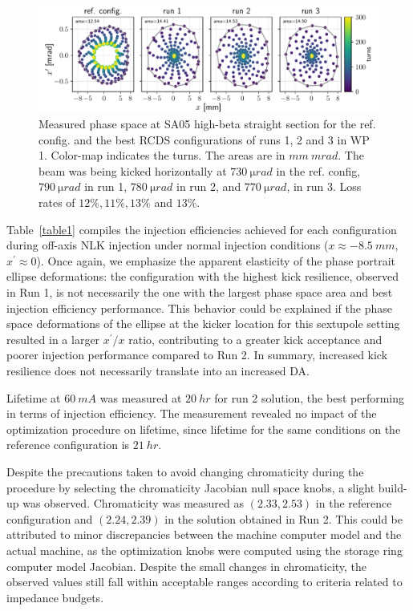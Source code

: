 \begin{figure}[tb]
    \centering
        \includegraphics[width=\textwidth]{Images/WEPL087_f2.pdf}
        \caption[Measured phase space at SA05 high-beta straight section for the ref. config. and the best RCDS configurations of runs 1, 2 and 3 in WP 1.]{Measured phase space at SA05 high-beta straight section for the ref. config. and the best RCDS configurations of runs 1, 2 and 3 in WP 1. Color-map indicates the turns. The areas are in $\unit{mm}~\unit{mrad}$. The beam was being kicked horizontally at $730~\unit{\micro rad}$ in the ref. config, $790~\unit{\micro rad}$ in run 1, $780~\unit{\micro rad}$ in run 2, and $770~\unit{\micro rad}$, in run 3. Loss rates of  $12\%, 11\%, 13\%$ and $13\%$.}
        \label{fig:oldtunes_phase}
\end{figure}

Table~\ref{table1} compiles the injection efficiencies achieved for each configuration during off-axis NLK injection under normal injection conditions ($x\approx -8.5~\unit{mm}$, $x^\prime\approx 0 $).
Once again, we emphasize the apparent elasticity of the phase portrait ellipse deformations: the configuration with the highest kick resilience, observed in Run 1, is not necessarily the one with the largest phase space area and best injection efficiency performance. This behavior could be explained if the phase space deformations of the ellipse at the kicker location for this sextupole setting resulted in a larger $x^\prime/x$ ratio, contributing to a greater kick acceptance and poorer injection performance compared to Run 2. In summary, increased kick resilience does not necessarily translate into an increased DA.

Lifetime at $60~\unit{mA}$ was measured at $20~\unit{hr}$ for run 2 solution, the best performing in terms of injection efficiency. The measurement revealed no impact of the optimization procedure on lifetime, since lifetime for the same conditions on the reference configuration is $21~\unit{hr}$.

Despite the precautions taken to avoid changing chromaticity during the procedure by selecting the chromaticity Jacobian null space knobs, a slight build-up was observed. Chromaticity was measured as $(2.33, 2.53)$ in the reference configuration and $(2.24, 2.39)$ in the solution obtained in Run 2. This could be attributed to minor discrepancies between the machine computer model and the actual machine, as the optimization knobs were computed using the storage ring computer model Jacobian. Despite the small changes in chromaticity, the observed values still fall within acceptable ranges according to criteria related to impedance budgets.

